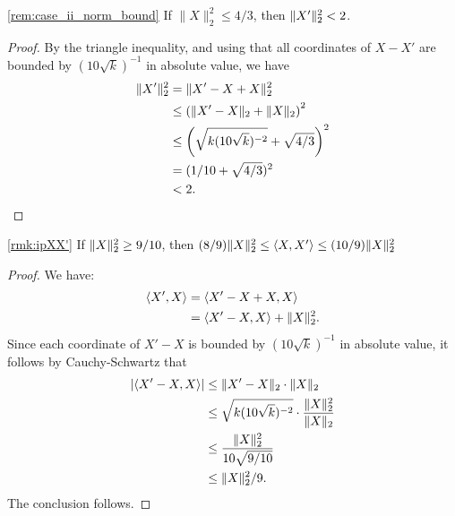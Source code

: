 \begin{customrmk}{\ref{rem:case_ii_norm_bound}}
   If $\|X\|_2^2 \leq 4/3$, then $\norm{X'}_2^2 < 2$.
\end{customrmk}
\begin{proof}
By the triangle inequality, and using that all coordinates of $X-X'$ are bounded by $(10 \sqrt{k})^{-1}$ in absolute value, we have
\begin{align*}
    \norm{X'}_2^2 &= \norm{X'-X+X}_2^2 \\
    &\leq \left(\|X'-X\|_2 + \|X\|_2\right)^2 \\
    &\leq \left(\sqrt{k (10 \sqrt{k})^{-2}} + \sqrt{4/3}\right)^2 \\
    &= (1/10 + \sqrt{4/3})^2 \\
    &< 2.
\end{align*}
\end{proof}

\begin{customrmk}{\ref{rmk:ipXX'}}
    If $\norm{X}_2^2\ge 9/10$, then $(8/9)\norm{X}_2^2\le \ipr{X,X'}\le (10/9)\norm{X}_2^2$
\end{customrmk}

\begin{proof}
We have:
\begin{align*}
    \langle X',X\rangle &= \langle X'-X + X,X\rangle \\
    &= \langle X'-X,X\rangle + \|X\|_2^2.
\end{align*}
Since each coordinate of $X'-X$ is bounded by $(10 \sqrt{k})^{-1}$ in absolute value, it follows by Cauchy-Schwartz that
\begin{align*}
    |\langle X'-X,X\rangle| &\leq \|X'-X\|_2 \cdot \|X\|_2 \\
    &\leq \sqrt{k (10 \sqrt{k})^{-2}} \cdot \frac{\|X\|^2_2}{\|X\|_2} \\
    &\leq \frac{\|X\|_2^2}{10 \sqrt{9/10}} \\
    &\leq \|X\|_2^2/9.
\end{align*}
The conclusion follows.
\end{proof}

